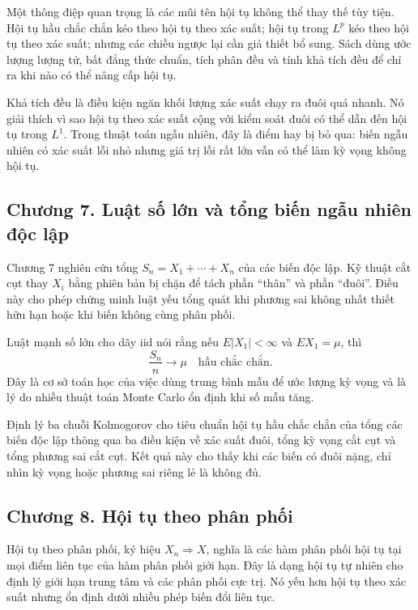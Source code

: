 \documentclass[11pt]{article}
\begin{document}
Một thông điệp quan trọng là các mũi tên hội tụ không thể thay thế tùy tiện.
Hội tụ hầu chắc chắn kéo theo hội tụ theo xác suất; hội tụ trong \(L^p\) kéo
theo hội tụ theo xác suất; nhưng các chiều ngược lại cần giả thiết bổ sung.
Sách dùng ước lượng lượng tử, bất đẳng thức chuẩn, tích phân đều và tính khả
tích đều để chỉ ra khi nào có thể nâng cấp hội tụ.

Khả tích đều là điều kiện ngăn khối lượng xác suất chạy ra đuôi quá nhanh. Nó
giải thích vì sao hội tụ theo xác suất cộng với kiểm soát đuôi có thể dẫn đến
hội tụ trong \(L^1\). Trong thuật toán ngẫu nhiên, đây là điểm hay bị bỏ qua:
biến ngẫu nhiên có xác suất lỗi nhỏ nhưng giá trị lỗi rất lớn vẫn có thể làm kỳ
vọng không hội tụ.

\subsection*{Chương 7. Luật số lớn và tổng biến ngẫu nhiên độc lập}

Chương 7 nghiên cứu tổng \(S_n=X_1+\cdots+X_n\) của các biến độc lập. Kỹ
thuật cắt cụt thay \(X_i\) bằng phiên bản bị chặn để tách phần ``thân'' và phần
``đuôi''. Điều này cho phép chứng minh luật yếu tổng quát khi phương sai không
nhất thiết hữu hạn hoặc khi biến không cùng phân phối.

Luật mạnh số lớn cho dãy iid nói rằng nếu \(E|X_1|<\infty\) và
\(E X_1=\mu\), thì
\[
  \frac{S_n}{n}\to\mu \quad \text{hầu chắc chắn.}
\]
Đây là cơ sở toán học của việc dùng trung bình mẫu để ước lượng kỳ vọng và là
lý do nhiều thuật toán Monte Carlo ổn định khi số mẫu tăng.

Định lý ba chuỗi Kolmogorov cho tiêu chuẩn hội tụ hầu chắc chắn của tổng các
biến độc lập thông qua ba điều kiện về xác suất đuôi, tổng kỳ vọng cắt cụt và
tổng phương sai cắt cụt. Kết quả này cho thấy khi các biến có đuôi nặng, chỉ
nhìn kỳ vọng hoặc phương sai riêng lẻ là không đủ.

\subsection*{Chương 8. Hội tụ theo phân phối}

Hội tụ theo phân phối, ký hiệu \(X_n\Rightarrow X\), nghĩa là các hàm phân phối
hội tụ tại mọi điểm liên tục của hàm phân phối giới hạn. Đây là dạng hội tụ tự
nhiên cho định lý giới hạn trung tâm và các phân phối cực trị. Nó yếu hơn hội
tụ theo xác suất nhưng ổn định dưới nhiều phép biến đổi liên tục.
\end{document}
